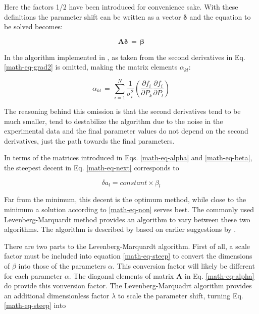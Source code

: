 Here the factors 1/2 have been introduced for convenience sake. With these definitions
the parameter shift can be written as a vector $\mathbf \delta$ and the equation to be
solved becomes:

\begin{equation}
  {\mathbf A} {\mathbf \delta} \,=\, {\mathbf \beta}
  \label{math-eq-non}
\end{equation}

In the algorithm implemented in , as taken from \cite{prstla2005} the 
second derivatives in Eq. \ref{math-eq-grad2} is omitted, making the matrix
elements $\alpha_{kl}$:

\begin{equation}
  \alpha_{kl} \,=\,
  \sum_{i=1}^{N} 
  \frac{1}{\sigma_{i}^2} \left (
  \frac{\partial{f_{i}}}{\partial{P_{k}}}
  \frac{\partial{f_{i}}}{\partial{P_{l}}} \right )
  \label{math-eq-alphakl}
\end{equation}

The reasoning behind this omission is that the second derivatives tend to be
much smaller, tend to destabilize the algorithm due to the noise in the 
experimental data and the final parameter values do not depend on the 
second derivatives, just the path towards the final parameters.

In terms of the matrices introduced in Eqs. \ref{math-eq-alpha} and 
\ref{math-eq-beta}, the steepest decent in Eq. \ref{math-eq-next}
corresponds to 

\begin{equation}
  \delta a_{l} = constant \times {\beta}_{l}
  \label{math-eq-steep}
\end{equation}

Far from the minimum, this decent is the optimum method, while close to the
minimum a solution according to \ref{math-eq-non} serves best. The 
commonly used Levenberg-Marquardt method provides an algorithm to vary 
between these two algorithms. The algorithm is described by 
\cite{ma1963} based on earlier suggestions by \cite{le1944}. 

There are two parts to the Levenberg-Marquardt algorithm. First of all, a
scale factor must be included into equation \ref{math-eq-steep} to 
convert the dimensions of ${\beta} $ into those of the parameters $\alpha$. 
This conversion factor will likely be different for each parameter $\alpha$.
The diagonal elements of matrix {\bf A} in Eq. \ref{math-eq-alpha} do 
provide this vonversion factor. The Levenberg-Marquadrt algorithm provides
an additional dimensionless factor $\lambda$ to scale the parameter shift,
turning Eq. \ref{math-eq-steep} into

